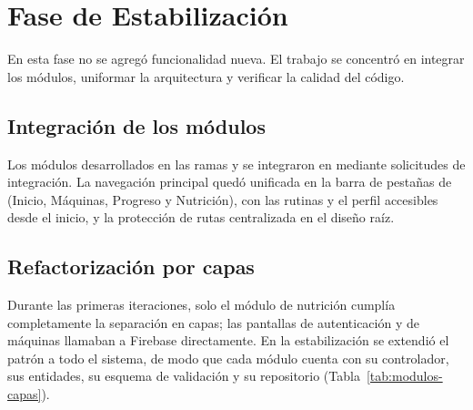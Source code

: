 \section{Fase de Estabilización}
\label{sec:estabilizacion}

En esta fase no se agregó funcionalidad nueva. El trabajo se concentró en
integrar los módulos, uniformar la arquitectura y verificar la calidad del
código.

\subsection{Integración de los módulos}

Los módulos desarrollados en las ramas  y
 se integraron en  mediante
solicitudes de integración. La navegación principal quedó unificada en la
barra de pestañas de  (Inicio, Máquinas, Progreso y
Nutrición), con las rutinas y el perfil accesibles desde el inicio, y la
protección de rutas centralizada en el diseño raíz.

\subsection{Refactorización por capas}

Durante las primeras iteraciones, solo el módulo de nutrición cumplía
completamente la separación en capas; las pantallas de autenticación y de
máquinas llamaban a Firebase directamente. En la estabilización se extendió el
patrón a todo el sistema, de modo que cada módulo cuenta con su controlador,
sus entidades, su esquema de validación y su repositorio
(Tabla~\ref{tab:modulos-capas}).

